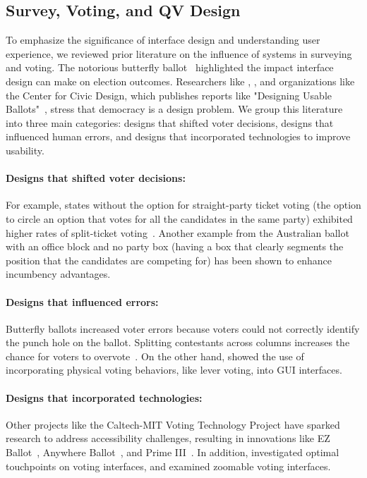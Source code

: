 \subsection{Survey, Voting, and QV Design}
To emphasize the significance of interface design and understanding user experience, we reviewed prior literature on the influence of systems in surveying and voting. The notorious butterfly ballot~\cite{wandButterflyDidIt2001} highlighted the impact interface design can make on election outcomes. Researchers like \textcite{engstrom2020politics}, \textcite{chisnellDemocracyDesignProblem2016}, and organizations like the Center for Civic Design, which publishes reports like "Designing Usable Ballots"~\cite{DesigningUsableBallots2015}, stress that democracy is a design problem. We group this literature into three main categories: designs that shifted voter decisions, designs that influenced human errors, and designs that incorporated technologies to improve usability.
\paragraph{Designs that shifted voter decisions: } For example, states without the option for straight-party ticket voting (the option to circle an option that votes for all the candidates in the same party) exhibited higher rates of split-ticket voting~\cite{engstrom2020politics}. Another example from the Australian ballot with an office block and no party box (having a box that clearly segments the position that the candidates are competing for) has been shown to enhance incumbency advantages.
\paragraph{Designs that influenced errors: } Butterfly ballots increased voter errors because voters could not correctly identify the punch hole on the ballot. Splitting contestants across columns increases the chance for voters to overvote~\cite{quesenberyOpinionGoodDesign2020}. On the other hand, \textcite{everettElectronicVotingMachines2008} showed the use of incorporating physical voting behaviors, like lever voting, into GUI interfaces.
\paragraph{Designs that incorporated technologies: } Other projects like the Caltech-MIT Voting Technology Project have sparked research to address accessibility challenges, resulting in innovations like EZ Ballot~\cite{leeUniversalDesignBallot2016}, Anywhere Ballot~\cite{summers2014making}, and Prime III~\cite{dawkinsPrimeIIIInnovative2009}. In addition, \textcite{gilbertAnomalyDetectionElectronic2013} investigated optimal touchpoints on voting interfaces, and \textcite{conradElectronicVotingEliminates2009} examined zoomable voting interfaces.


